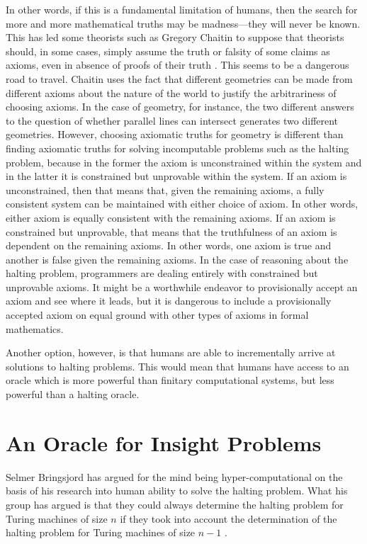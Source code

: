 In other words, if this is a fundamental limitation of humans, then the search for more and more mathematical truths may be madness---they will never be known.  This has led some theorists such as Gregory Chaitin to suppose that theorists should, in some cases, simply assume the truth or falsity of some claims as axioms, even in absence of proofs of their truth \citep{chaitin2006}.  This seems to be a dangerous road to travel.  Chaitin uses the fact that different geometries can be made from different axioms about the nature of the world to justify the arbitrariness of choosing axioms.  In the case of geometry, for instance, the two different answers to the question of whether parallel lines can intersect generates two different geometries.  However, choosing axiomatic truths for geometry is different than finding axiomatic truths for solving incomputable problems such as the halting problem, because in the former the axiom is unconstrained within the system and in the latter it is constrained but unprovable within the system.  If an axiom is unconstrained, then that means that, given the remaining axioms, a fully consistent system can be maintained with either choice of axiom.  In other words, either axiom is equally consistent with the remaining axioms.  If an axiom is constrained but unprovable, that means that the truthfulness of an axiom is dependent on the remaining axioms.  In other words, one axiom is true and another is false given the remaining axioms.  In the case of reasoning about the halting problem, programmers are dealing entirely with constrained but unprovable axioms.  It might be a worthwhile endeavor to provisionally accept an axiom and see where it leads, but it is dangerous to include a provisionally accepted axiom on equal ground with other types of axioms in formal mathematics.

Another option, however, is that humans are able to incrementally arrive at solutions to halting problems.  This would mean that humans have access to an oracle which is more powerful than finitary computational systems, but less powerful than a halting oracle.

\section{An Oracle for Insight Problems}
Selmer Bringsjord has argued for the mind being hyper-computational on the basis of his research into human ability to solve the halting problem.  What his group has argued is that they could always determine the halting problem for Turing machines of size $n$ if they took into account the determination of the halting problem for Turing machines of size $n - 1$ .

